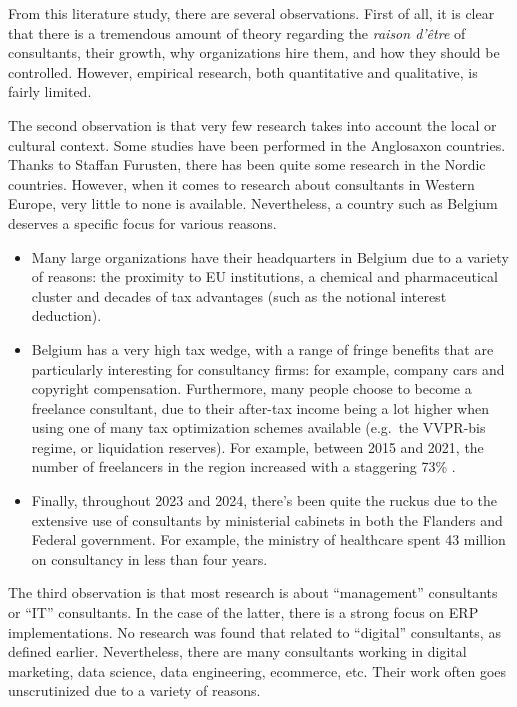 \documentclass[12pt]{article}
\begin{document}
From this literature study, there are several observations. First of
all, it is clear that there is a tremendous amount of theory regarding
the \emph{raison d'être} of consultants, their growth, why organizations
hire them, and how they should be controlled. However, empirical
research, both quantitative and qualitative, is fairly limited.

The second observation is that very few research takes into account the
local or cultural context. Some studies have been performed in the
Anglosaxon countries. Thanks to Staffan Furusten, there has been quite
some research in the Nordic countries. However, when it comes to
research about consultants in Western Europe, very little to none is
available. Nevertheless, a country such as Belgium deserves a specific
focus for various reasons.

\begin{itemize}
\item
  Many large organizations have their headquarters in Belgium due to a
  variety of reasons: the proximity to EU institutions, a chemical and
  pharmaceutical cluster and decades of tax advantages (such as the
  notional interest deduction).
\item
  Belgium has a very high tax wedge, with a range of fringe benefits
  that are particularly interesting for consultancy firms: for example,
  company cars and copyright compensation. Furthermore, many people
  choose to become a freelance consultant, due to their after-tax income
  being a lot higher when using one of many tax optimization schemes
  available (e.g.~the VVPR-bis regime, or liquidation reserves). For
  example, between 2015 and 2021, the number of freelancers in the
  region increased with a staggering 73\% \citep{serv2023}.
\item
  Finally, throughout 2023 and 2024, there's been quite the ruckus due
  to the extensive use of consultants by ministerial cabinets in both
  the Flanders and Federal government. For example, the ministry of
  healthcare spent 43 million on consultancy in less than four years.
  \citep{healthcare2023}
\end{itemize}

The third observation is that most research is about ``management''
consultants or ``IT'' consultants. In the case of the latter, there is a
strong focus on ERP implementations. No research was found that related
to ``digital'' consultants, as defined earlier. Nevertheless, there are
many consultants working in digital marketing, data science, data
engineering, ecommerce, etc. Their work often goes unscrutinized due to
a variety of reasons.
\end{document}
